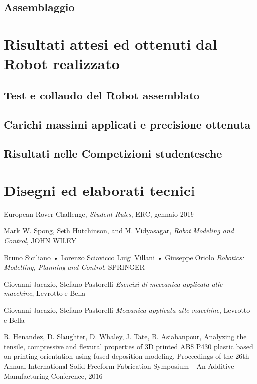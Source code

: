 \documentclass[%
corpo=11pt,
twoside,
 stile=classica,
oldstyle,
greek,%
]{toptesi}
\begin{document}
	\section{Assemblaggio}
	
\chapter{Risultati attesi ed ottenuti dal Robot realizzato}
	\section{Test e collaudo del Robot assemblato}
	\section{Carichi massimi applicati e precisione ottenuta}
	\section{Risultati nelle Competizioni studentesche }

\backmatter
\chapter{Disegni ed elaborati tecnici}







\begin{thebibliography}{9}
 European Rover Challenge, \emph{Student Rules}, ERC, gennaio 2019

Mark W. Spong, Seth Hutchinson, and M. Vidyasagar, \emph{Robot Modeling and Control}, JOHN WILEY  

Bruno Siciliano • Lorenzo Sciavicco Luigi Villani • Giuseppe Oriolo \emph{Robotics: Modelling, Planning and Control}, SPRINGER

Giovanni Jacazio, Stefano Pastorelli \emph{Esercizi di meccanica applicata alle macchine}, Levrotto e Bella

Giovanni Jacazio, Stefano Pastorelli \emph{Meccanica applicata alle macchine}, Levrotto e Bella

 R. Henandez, D. Slaughter, D. Whaley, J. Tate, B. Asiabanpour, Analyzing the tensile, compressive and flexural properties of 3D printed ABS P430 plastic based on printing orientation using fused deposition modeling, Proceedings of the 26th Annual International Solid Freeform Fabrication Symposium – An Additive Manufacturing Conference, 2016
\end{thebibliography}
\end{document}
